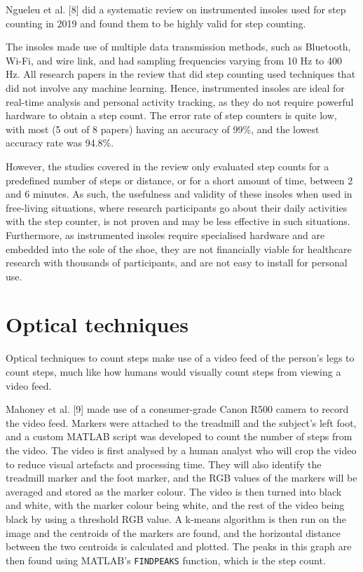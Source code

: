 \documentclass[12pt]{report}
\makeatletter
\newcommand{\cslcitation}[2]
 {\protect\hyper@linkstart{cite}{citeproc_bib_item_#1}#2\hyper@linkend}
\makeatother
\begin{document}
Ngueleu et al. \cslcitation{8}{[8]} did a systematic review
on instrumented insoles used for step counting in 2019 and
found them to be highly valid for step counting.

The insoles made use of multiple data transmission methods,
such as Bluetooth, Wi-Fi, and wire link, and had sampling
frequencies varying from 10 Hz to 400 Hz. All research
papers in the review that did step counting used
techniques that did not involve any machine learning.
Hence, instrumented insoles are ideal for real-time
analysis and personal activity tracking, as they do not
require powerful hardware to obtain a step count.
The error rate of step counters is quite low,
with most (5 out of 8 papers) having an accuracy of 99\%,
and the lowest accuracy rate was 94.8\%.

However, the studies covered in the review only evaluated
step counts for a predefined number of steps or distance,
or for a short amount of time, between 2 and 6 minutes.
As such, the usefulness and validity of these insoles
when used in free-living situations, where research participants
go about their daily activities with the step counter,
is not proven and may be less effective in such situations.
Furthermore, as instrumented insoles require specialised hardware
and are embedded into the sole of the shoe, they are not financially
viable for healthcare research with thousands of participants,
and are not easy to install for personal use.
\section{Optical techniques}
\label{sec:org8dea9e4}
Optical techniques to count steps make use of a video feed of the
person's legs to count steps, much like how humans would visually
count steps from viewing a video feed.

Mahoney et al. \cslcitation{9}{[9]} made use of a consumer-grade
Canon R500 camera to record the video feed.
Markers were attached to the treadmill and the subject's left foot,
and a custom MATLAB script was developed to
count the number of steps from the video.
The video is first analysed by a human analyst who will crop the video
to reduce visual artefacts and processing time.
They will also identify the treadmill marker and the foot marker,
and the RGB values of the markers will be averaged and stored as
the marker colour. The video is then turned into black and white,
with the marker colour being white,
and the rest of the video being black by using a threshold RGB value.
A k-means algorithm is then run on the image and the centroids of
the markers are found, and the horizontal distance between the two
centroids is calculated and plotted. The peaks in this graph are then
found using MATLAB's \texttt{FINDPEAKS} function, which is the step count.
\end{document}
